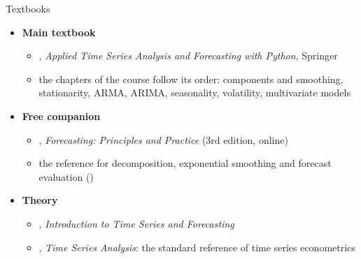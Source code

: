 \begin{frame}{Textbooks}
\itemsize{\small}
\begin{itemize}
    \item \textbf{Main textbook}
    \begin{itemize}
        \item {}, \emph{Applied Time Series Analysis and Forecasting with Python}, Springer
        \item the chapters of the course follow its order: components and smoothing, stationarity, ARMA, ARIMA, seasonality, volatility, multivariate models
    \end{itemize}
    \item \textbf{Free companion}
    \begin{itemize}
        \item {}, \emph{Forecasting: Principles and Practice} (3rd edition, online)
        \item the reference for decomposition, exponential smoothing and forecast evaluation ()
    \end{itemize}
    \item \textbf{Theory}
    \begin{itemize}
        \item {}, \emph{Introduction to Time Series and Forecasting}
        \item {}, \emph{Time Series Analysis}: the standard reference of time series econometrics
    \end{itemize}
\end{itemize}
\end{frame}

